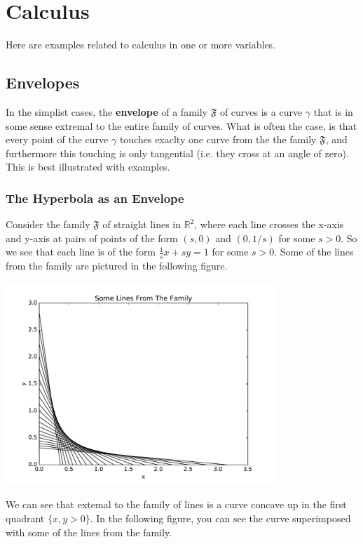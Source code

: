 \section{Calculus}

Here are examples related to calculus in one or more variables.

\subsection{Envelopes}

In the simplist cases, the \textbf{envelope} of a family \(\mathfrak F\) of curves is a curve \(\gamma\) that is in some sense extremal to the entire family of curves. 
What is often the case, is that every point of the curve \(\gamma\) touches exaclty one curve from the the family \(\mathfrak F\), and furthermore this touching is only tangential (i.e. they cross at an angle of zero). 
This is best illustrated with examples. 

\subsubsection{The Hyperbola as an Envelope}

Consider the family \(\mathfrak F\) of straight lines in \(\mathbb R^2\), where each line crosses the x-axis and y-axis at pairs of points of the form \((s,0)\) and \((0, 1/s)\) for some \(s > 0\). 
So we see that each line is of the form \(\frac{1}{s} x + s y = 1\) for some \(s > 0\).
Some of the lines from the family are pictured in the following figure.

\includegraphics[width = 4.0in]{calculus/hyperbolaFamily.pdf}

We can see that extemal to the family of lines is a curve concave up in the first quadrant \(\{x, y > 0\}\). In the following figure, you can see the curve superimposed with some of the lines from the family.

